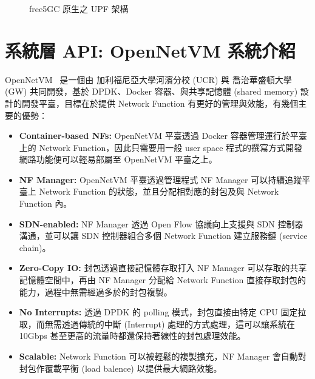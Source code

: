 \begin{figure}[htbp]
    \caption[free5GC 原生之 UPF 架構]{{\footnotesize free5GC 原生之 UPF 架構}}
    \label{fig:free5gc_upf_arch}
\end{figure}

\section{系統層 API: OpenNetVM 系統介紹}
\label{sec:opennetvm_intro}

OpenNetVM~\cite{onvm} 是一個由 加利福尼亞大學河濱分校 (UCR) 與 喬治華盛頓大學 (GW) 共同開發，基於 DPDK、Docker 容器、與共享記憶體 (shared memory) 設計的開發平臺，目標在於提供 Network Function 有更好的管理與效能，有幾個主要的優勢：

\begin{itemize}
\item \textbf{Container-based NFs:} OpenNetVM 平臺透過 Docker 容器管理運行於平臺上的 Network Function，因此只需要用一般 user space 程式的撰寫方式開發網路功能便可以輕易部屬至 OpenNetVM 平臺之上。
\item \textbf{NF Manager:} OpenNetVM 平臺透過管理程式 NF Manager 可以持續追蹤平臺上 Network Function 的狀態，並且分配相對應的封包及與 Network Function 內。
\item \textbf{SDN-enabled:} NF Manager 透過 Open Flow 協議向上支援與 SDN 控制器溝通，並可以讓 SDN 控制器組合多個 Network Function 建立服務鏈 (service chain)。
\item \textbf{Zero-Copy IO:} 封包透過直接記憶體存取打入 NF Manager 可以存取的共享記憶體空間中，再由 NF Manager 分配給 Network Function 直接存取封包的能力，過程中無需經過多於的封包複製。
\item \textbf{No Interrupts:} 透過 DPDK 的 polling 模式，封包直接由特定 CPU 固定拉取，而無需透過傳統的中斷 (Interrupt) 處理的方式處理，這可以讓系統在 10Gbps 甚至更高的流量時都還保持著線性的封包處理效能。
\item \textbf{Scalable:} Network Function 可以被輕鬆的複製擴充，NF Manager 會自動對封包作覆載平衡 (load balence) 以提供最大網路效能。
\end{itemize}

